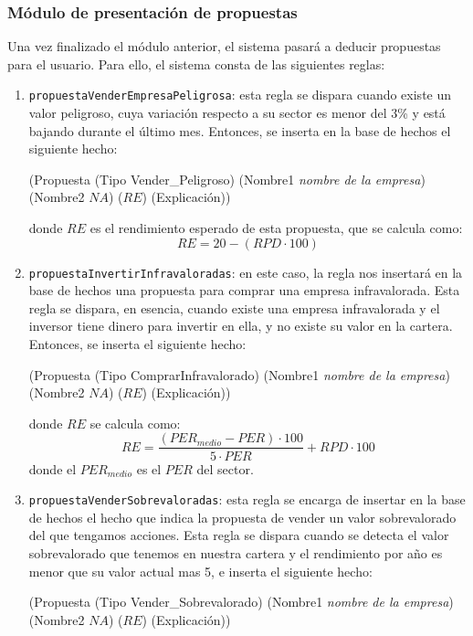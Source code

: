 \documentclass[10pt,spanish]{article}
\theoremstyle{plain}
\theoremstyle{definition}
\begin{document}
\subsubsection{Módulo de presentación de propuestas}

Una vez finalizado el módulo anterior, el sistema pasará a deducir propuestas para el usuario. Para ello, el sistema consta de las siguientes reglas:

\begin{enumerate}[---]
    \item \texttt{propuestaVenderEmpresaPeligrosa}: esta regla se dispara cuando existe un valor peligroso, cuya variación respecto a su sector es menor del 3\% y está bajando durante el último mes. Entonces, se inserta en la base de hechos el siguiente hecho:
    \begin{center}
        (Propuesta (Tipo Vender\_Peligroso) (Nombre1 \textit{nombre de la empresa}) (Nombre2 $NA$) ($RE$) (Explicación))
    \end{center}
    donde $RE$ es el rendimiento esperado de esta propuesta, que se calcula como:
    $$RE = 20 - (RPD\cdot100)$$
    \item \texttt{propuestaInvertirInfravaloradas}: en este caso, la regla nos insertará en la base de hechos una propuesta para comprar una empresa infravalorada. Esta regla se dispara, en esencia, cuando existe una empresa infravalorada y el inversor tiene dinero para invertir en ella, y no existe su valor en la cartera. Entonces, se inserta el siguiente hecho:
    \begin{center}
        (Propuesta (Tipo ComprarInfravalorado) (Nombre1 \textit{nombre de la empresa}) (Nombre2 $NA$) ($RE$) (Explicación))
    \end{center}
    donde $RE$ se calcula como:
    $$RE = \frac{(PER_{medio} - PER) \cdot 100}{5\cdot PER} + RPD \cdot 100$$
    donde el $PER_{medio}$ es el $PER$ del sector. 
    \item \texttt{propuestaVenderSobrevaloradas}: esta regla se encarga de insertar en la base de hechos el hecho que indica la propuesta de vender un valor sobrevalorado del que tengamos acciones. Esta regla se dispara cuando se detecta el valor sobrevalorado que tenemos en nuestra cartera y el rendimiento por año es menor que su valor actual mas 5, e inserta el siguiente hecho:
    \begin{center}
        (Propuesta (Tipo Vender\_Sobrevalorado) (Nombre1 \textit{nombre de la empresa}) (Nombre2 $NA$) ($RE$) (Explicación))
    \end{center}

\end{enumerate}
\end{document}
